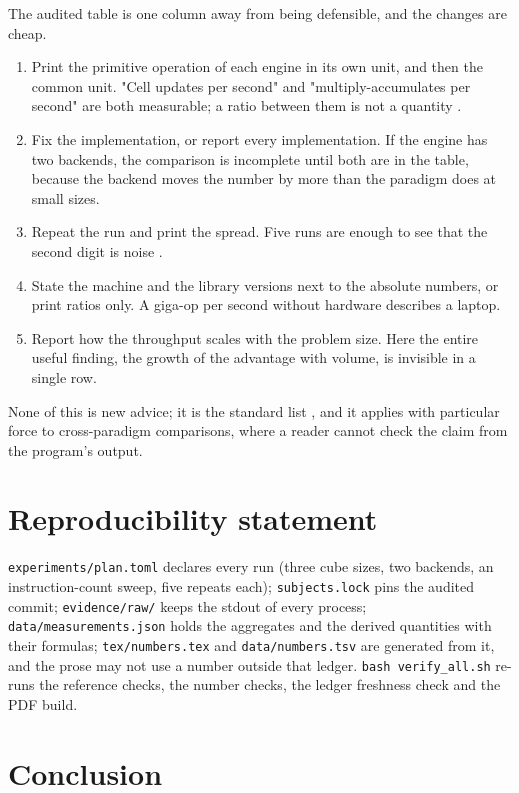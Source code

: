 \documentclass[11pt,a4paper]{article}
\begin{document}
The audited table is one column away from being defensible, and the changes are cheap.

\begin{enumerate}
\item Print the primitive operation of each engine in its own unit, and then the common unit.
  "Cell updates per second" and "multiply-accumulates per second" are both measurable; a ratio
  between them is not a quantity \citep{ofenbeck2014}.
\item Fix the implementation, or report every implementation. If the engine has two backends, the
  comparison is incomplete until both are in the table, because the backend moves the number by
  more than the paradigm does at small sizes.
\item Repeat the run and print the spread. Five runs are enough to see that the second digit is
  noise \citep{georges2007,curtsinger2013}.
\item State the machine and the library versions next to the absolute numbers, or print ratios
  only. A giga-op per second without hardware describes a laptop.
\item Report how the throughput scales with the problem size. Here the entire useful finding, the
  growth of the advantage with volume, is invisible in a single row.
\end{enumerate}

None of this is new advice; it is the standard list \citep{hoefler2015}, and it applies with
particular force to cross-paradigm comparisons, where a reader cannot check the claim from the
program's output.

\section{Reproducibility statement}

\texttt{experiments/plan.toml} declares every run (three cube sizes, two backends, an
instruction-count sweep, five repeats each); \texttt{subjects.lock} pins the audited commit;
\texttt{evidence/raw/} keeps the stdout of every process; \texttt{data/measurements.json} holds the
aggregates and the derived quantities with their formulas; \texttt{tex/numbers.tex} and
\texttt{data/numbers.tsv} are generated from it, and the prose may not use a number outside that
ledger. \texttt{bash verify\_all.sh} re-runs the reference checks, the number checks, the ledger
freshness check and the PDF build.

\section{Conclusion}
\end{document}
